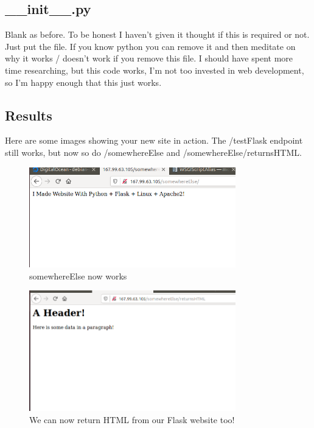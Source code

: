 \documentclass[10pt]{article}
\begin{document}
\subsection{\_\_init\_\_.py}
Blank as before. To be honest I haven't given it thought if this is required or
not. Just put the file. If you know python you can remove it and then meditate
on why it works / doesn't work if you remove this file. I should have spent more
time researching, but this code works, I'm not too invested in web development,
so I'm happy enough that this just works.

\subsection{ Results }
Here are some images showing your new site in action. The /testFlask endpoint still works, but now so do /somewhereElse and /somewhereElse/returnsHTML.

\begin{figure}[h]
  \centering
    \includegraphics[width=0.8\textwidth]{somewhereElse.png}
  \caption{somewhereElse now works}
\end{figure}

\begin{figure}[h]
  \centering
    \includegraphics[width=0.8\textwidth]{somewhereElse_returnsHTML.png}
  \caption{We can now return HTML from our Flask website too!}
\end{figure}
\end{document}

